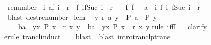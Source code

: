 \begin{isabellebody}
\isamarkupfalse%
%
\endisatagproof
{\isafoldproof}%
%
\isadelimproof
\isanewline
%
\endisadelimproof
\isanewline
{}\isamarkupfalse%
\ renumber{\isacharcolon}\isanewline
\ {\isachardoublequoteopen}{\isasymforall}i{\isachardot}\ {\isacharparenleft}a{\isacharcomma}f\ i{\isacharparenright}\ {\isasymin}\ r\isactrlsup {\isacharasterisk}\ {\isasymand}\ {\isacharparenleft}f\ i{\isacharcomma}f{\isacharparenleft}Suc\ i{\isacharparenright}{\isacharparenright}\ {\isasymin}\ r\ \isanewline
\ {\isasymLongrightarrow}\ {\isasymexists}f{\isachardot}\ f\ {}\ {\isacharequal}\ a\ {\isasymand}\ {\isacharparenleft}{\isasymforall}i{\isachardot}\ {\isacharparenleft}f\ i{\isacharcomma}\ f{\isacharparenleft}Suc\ i{\isacharparenright}{\isacharparenright}\ {\isasymin}\ r{\isacharparenright}{\isachardoublequoteclose}\isanewline
%
\isadelimproof
\ \ %
\endisadelimproof
%
\isatagproof
{}\isamarkupfalse%
\ {\isacharparenleft}blast\ dest{\isacharcolon}renumber{\isacharprime}{\isacharparenright}%
\endisatagproof
{\isafoldproof}%
%
\isadelimproof
\isanewline
%
\endisadelimproof
\isanewline
{}\isamarkupfalse%
\ lem{\isacharcolon}\isanewline
\ \ {\isachardoublequoteopen}{\isasymforall}y{\isachardot}\ r\isactrlsup {\isacharplus}\isactrlsup {\isacharplus}\ a\ y\ {\isasymlongrightarrow}\ P\ a\ {\isasymlongrightarrow}\ P\ y\ \isanewline
\ \ \ {\isasymLongrightarrow}\ {\isacharparenleft}{\isacharparenleft}b{\isacharcomma}a{\isacharparenright}\ {\isasymin}\ {\isacharbraceleft}{\isacharparenleft}y{\isacharcomma}x{\isacharparenright}{\isachardot}\ P\ x\ {\isasymand}\ r\ x\ y{\isacharbraceright}\isactrlsup {\isacharplus}{\isacharparenright}\ {\isacharequal}\ {\isacharparenleft}{\isacharparenleft}b{\isacharcomma}a{\isacharparenright}\ {\isasymin}\ {\isacharbraceleft}{\isacharparenleft}y{\isacharcomma}x{\isacharparenright}{\isachardot}\ P\ x\ {\isasymand}\ r\isactrlsup {\isacharplus}\isactrlsup {\isacharplus}\ x\ y{\isacharbraceright}{\isacharparenright}{\isachardoublequoteclose}\isanewline
%
\isadelimproof
%
\endisadelimproof
%
\isatagproof
{}\isamarkupfalse%
{\isacharparenleft}rule\ iffI{\isacharparenright}\isanewline
\ \isamarkupfalse%
\ clarify\isanewline
\ \isamarkupfalse%
{\isacharparenleft}erule\ trancl{\isacharunderscore}induct{\isacharparenright}\isanewline
\ \ \isamarkupfalse%
\ blast\isanewline
\ \isamarkupfalse%
{\isacharparenleft}blast\ intro{\isacharcolon}tranclp{\isacharunderscore}trans{\isacharparenright}\isanewline
{}\isamarkupfalse%

\end{isabellebody}
